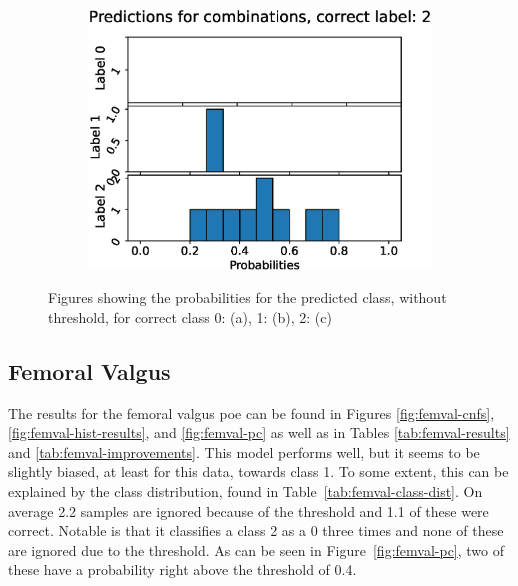 \begin{figure}
\begin{subfigure}[t]{0.33\textwidth}
    \includegraphics[width=\textwidth]{files/figs/res/pelvis/pc2.eps}
    \caption{}
    \label{fig:pelvis-pc2}
  \end{subfigure}

  \caption{Figures showing the probabilities for the predicted class, without threshold, for correct class 0: (a), 1: (b), 2: (c)}
  \label{fig:pelvis-pc}
\end{figure}


\FloatBarrier
\subsection{Femoral Valgus}
The results for the femoral valgus \gls{poe} can be found in Figures \ref{fig:femval-cnfs}, \ref{fig:femval-hist-results}, and \ref{fig:femval-pc} as well as in Tables \ref{tab:femval-results} and \ref{tab:femval-improvements}.
This model performs well, but it seems to be slightly biased, at least for this data, towards class 1. To some extent, this can be explained by the class distribution, found in Table~\ref{tab:femval-class-dist}. On average 2.2 samples are ignored because of the threshold and 1.1 of these were correct. Notable is that it classifies a class 2 as a 0 three times and none of these are ignored due to the threshold. As can be seen in Figure~\ref{fig:femval-pc}, two of these have a probability right above the threshold of 0.4.


